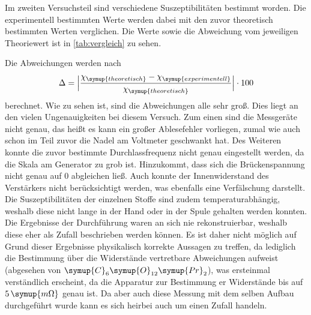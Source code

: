 Im zweiten Versuchsteil sind verschiedene Suszeptibilitäten bestimmt worden. Die experimentell bestimmten Werte werden dabei mit den zuvor
theoretisch bestimmten Werten verglichen. Die Werte sowie die Abweichung vom jeweiligen Theoriewert ist in \autoref{tab:vergleich} zu sehen.

Die Abweichungen werden nach 
\begin{equation}
\label{eqn:abweich}
\Delta = \Bigl| \frac{\chi_{\symup{theoretisch}} - \chi_{\symup{experimentell}}}{\chi_{\symup{theoretisch}}} \Bigr| \cdot 100
\end{equation}
berechnet. Wie zu sehen ist, sind die Abweichungen alle sehr groß. Dies liegt an den vielen Ungenauigkeiten bei diesem Versuch.
Zum einen sind die Messgeräte nicht genau, das heißt es kann ein großer Ablesefehler vorliegen, zumal wie auch schon im Teil zuvor
die Nadel am Voltmeter geschwankt hat. Des Weiteren konnte die zuvor bestimmte Durchlassfrequenz nicht genau eingestellt werden, da die 
Skala am Generator zu grob ist. Hinzukommt, dass sich die Brückenspannung nicht genau auf 0 abgleichen ließ. Auch konnte der 
Innenwiderstand des Verstärkers nicht berücksichtigt werden, was ebenfalls eine Verfälschung darstellt. Die Suszeptibilitäten der einzelnen 
Stoffe sind zudem temperaturabhängig, weshalb diese nicht lange in der Hand oder in der Spule gehalten werden konnten. Die Ergebnisse 
der Durchführung waren an sich nie rekonstruierbar, weshalb diese eher als Zufall beschrieben werden können. Es ist daher nicht möglich
auf Grund dieser Ergebnisse physikalisch korrekte Aussagen zu treffen, da lediglich die Bestimmung über die Widerstände vertretbare 
Abweichungen aufweist (abgesehen von $\symup{C}_6\symup{O}_{12}\symup{Pr}_2$), was ersteinmal verständlich erscheint, da die Apparatur
zur Bestimmung er Widerstände bis auf $5 \, \symup{m\Omega}$ genau ist. Da aber auch diese Messung mit dem selben Aufbau durchgeführt wurde
kann es sich heirbei auch um einen Zufall handeln. 